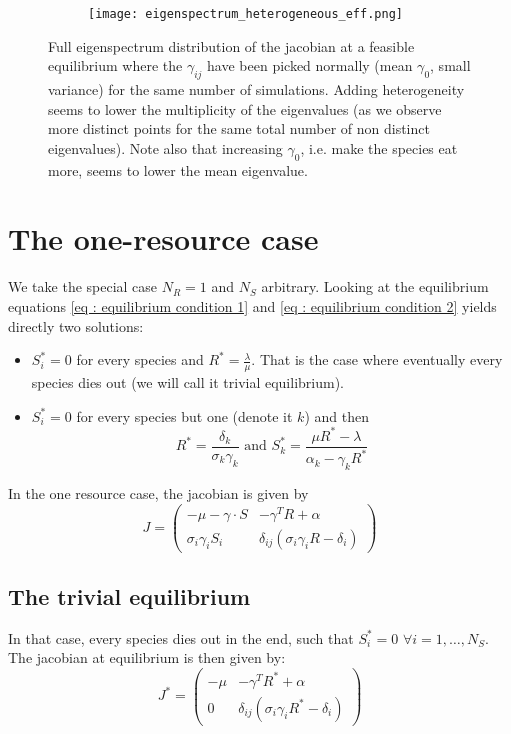 \documentclass[12pt]{article}
\begin{document}
\begin{appendices}
\begin{figure}
		\begin{subfigure}{0.49\textwidth}
			\texttt{[image: eigenspectrum\_heterogeneous\_eff.png]}
		\end{subfigure}
		\caption{Full eigenspectrum distribution of the jacobian at a feasible equilibrium where the $\gamma_{ij}$ have been picked normally (mean $\gamma_0$, small variance) for the same number of simulations. Adding heterogeneity seems to lower the multiplicity of the eigenvalues (as we observe more distinct points for the same total number of non distinct eigenvalues). Note also that increasing $\gamma_0$, i.e. make the species eat more, seems to lower the mean eigenvalue. }\label{fig : effect heterogeneity eigenspectrum} 
	\end{figure}
	
	\clearpage
	\section{The one-resource case}
	We take the special case $N_R = 1$ and $N_S$ arbitrary. Looking at the equilibrium equations \eqref{eq : equilibrium condition 1} and \eqref{eq : equilibrium condition 2} yields directly two solutions:
	\begin{itemize}
		\item $S^*_i = 0 $ for every species and $R^* = \frac{\lambda}{\mu}$. That is the case where eventually every species dies out (we will call it trivial equilibrium).
		\item $S^*_i = 0$ for every species but one (denote it $k$) and then $$R^* = \frac{\delta_k}{\sigma_k \gamma_k}  \text{ and } S^*_k = \frac{\mu R^* - \lambda}{\alpha_k - \gamma_k R^*}$$
	\end{itemize}

	In the one resource case, the jacobian is given by
	\begin{equation}
		J = 
		\begin{pmatrix}
			- \mu - \gamma \cdot S & -\gamma^T R + \alpha \\
			\sigma_i \gamma_i S_i & \delta_{ij}(\sigma_i \gamma_i R - \delta_i)
		\end{pmatrix}
	\end{equation}
		\subsection{The trivial equilibrium}
	In that case, every species dies out in the end, such that $S^*_i = 0$ $\forall i = 1,\dots, N_S$. The jacobian at equilibrium is then given by:
	\begin{equation}
		J^* = 
		\begin{pmatrix}
			- \mu & -\gamma^T R^* + \alpha \\
			0 & \delta_{ij}(\sigma_i \gamma_i R^*-\delta_i)
		\end{pmatrix}
	\end{equation}

\end{appendices}
\end{document}
